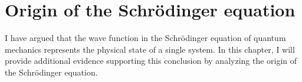 

\chapter{Origin of the Schr\"{o}dinger equation}








I have argued that the wave function in the Schr\"{o}dinger equation of quantum mechanics represents the physical state of a single system. In this chapter, I will provide additional evidence supporting this conclusion by analyzing the origin of the Schr\"{o}dinger equation. 

